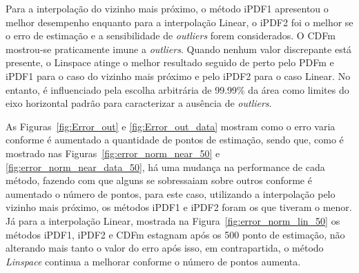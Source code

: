 Para a interpolação do vizinho mais próximo, o método \ac{iPDF1} apresentou o melhor desempenho enquanto para a interpolação Linear, o \ac{iPDF2} foi o melhor se o erro de estimação e a sensibilidade de \textit{outliers} forem considerados. O \ac{CDFm} mostrou-se praticamente imune a \textit{outliers}. Quando nenhum valor discrepante está presente, o Linspace atinge o melhor resultado seguido de perto pelo \ac{PDFm} e \ac{iPDF1} para o caso do vizinho mais próximo e pelo \ac{iPDF2} para o caso Linear. No entanto, é influenciado pela escolha arbitrária de 99.99\% da área como limites do eixo horizontal padrão para caracterizar a ausência de \textit{outliers}. 

As Figuras~\ref{fig:Error_out} e \ref{fig:Error_out_data} mostram como o erro varia conforme é aumentado a quantidade de pontos de estimação, sendo que, como é mostrado nas Figuras~\ref{fig:error_norm_near_50} e \ref{fig:error_norm_near_data_50}, há uma mudança na performance de cada método, fazendo com que alguns se sobressaiam sobre outros conforme é aumentado o número de pontos, para este caso, utilizando a interpolação pelo vizinho mais próximo, os métodos \ac{iPDF1} e \ac{iPDF2} foram os que tiveram o menor. Já para a interpolação Linear, mostrada na Figura~\ref{fig:error_norm_lin_50} os métodos \ac{iPDF1}, \ac{iPDF2} e \ac{CDFm} estagnam após os 500 ponto de estimação, não alterando mais tanto o valor do erro após isso, em contrapartida, o método \textit{Linspace} continua a melhorar conforme o número de pontos aumenta.


